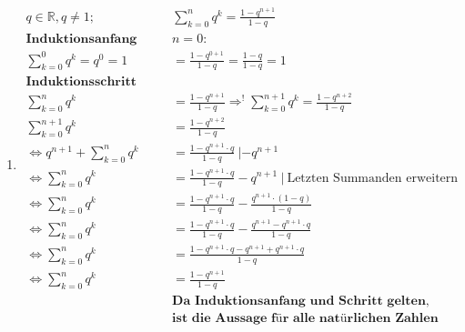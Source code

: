 \documentclass{article}
\begin{document}
\begin{enumerate}[label = (\alph*)]
            \item
                \begin{align*}
                    q \in \mathbb{R}, q \neq 1; \: & \sum_{k=0}^{n} q^k = \frac{1-q^{n+1}}{1-q} \\
                    \textbf{Induktionsanfang mit } & n=0: \\
                    \sum_{k=0}^{0} q^k = q^0 = 1 & = \frac{1-q^{0+1}}{1-q} = \frac{1-q}{1-q} = 1 \\
                    \textbf{Induktionsschritt} & \\
                    \sum_{k=0}^{n} q^k & = \frac{1-q^{n+1}}{1-q} \Rightarrow^! \sum_{k=0}^{n+1} q^k = \frac{1-q^{n+2}}{1-q} \\
                    \sum_{k=0}^{n+1} q^k &= \frac{1-q^{n+2}}{1-q} \\
                    \Leftrightarrow q^{n+1} + \sum_{k=0}^{n} q^k &= \frac{1-q^{n+1} \cdot q}{1-q} \: | - q^{n+1} \\
                    \Leftrightarrow \sum_{k=0}^{n} q^k &= \frac{1-q^{n+1} \cdot q}{1-q} - q^{n+1} \: | \: \text{Letzten Summanden erweitern}\\
                    \Leftrightarrow \sum_{k=0}^{n} q^k &= \frac{1-q^{n+1} \cdot q}{1-q} - \frac{q^{n+1}\cdot(1-q)}{1-q} \\
                    \Leftrightarrow \sum_{k=0}^{n} q^k &= \frac{1-q^{n+1} \cdot q}{1-q} - \frac{q^{n+1}- q^{n+1} \cdot q}{1-q} \\
                    \Leftrightarrow \sum_{k=0}^{n} q^k &= \frac{1-q^{n+1} \cdot q - q^{n+1} + q^{n+1} \cdot q}{1-q} \\
                    \Leftrightarrow \sum_{k=0}^{n} q^k &= \frac{1 - q^{n+1}}{1-q} \\
                    &\textbf{Da Induktionsanfang und Schritt gelten,} \\
                    &\textbf{ist die Aussage für alle natürlichen Zahlen gültig}
                \end{align*}
                

\end{enumerate}
\end{document}
